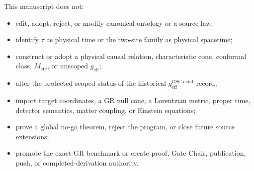 \documentclass[11pt]{article}
\begin{document}
This manuscript does not:
\begin{itemize}
  \item edit, adopt, reject, or modify canonical ontology or a source law;
  \item identify \(\tau\) as physical time or the two-site family as physical
  spacetime;
  \item construct or adopt a physical causal relation, characteristic cone,
  conformal class, \(M_{\mathrm{src}}\), or unscoped \(g_{\mathrm{eff}}\);
  \item alter the protected scoped status of the historical
  \(g_{\mathrm{eff}}^{\mathrm{GSC\mbox{-}cand}}\) record;
  \item import target coordinates, a GR null cone, a Lorentzian metric,
  proper time, detector semantics, matter coupling, or Einstein equations;
  \item prove a global no-go theorem, reject the program, or close future
  source extensions;
  \item promote the exact-GR benchmark or create proof, Gate Chair,
  publication, push, or completed-derivation authority.
\end{itemize}
\end{document}

